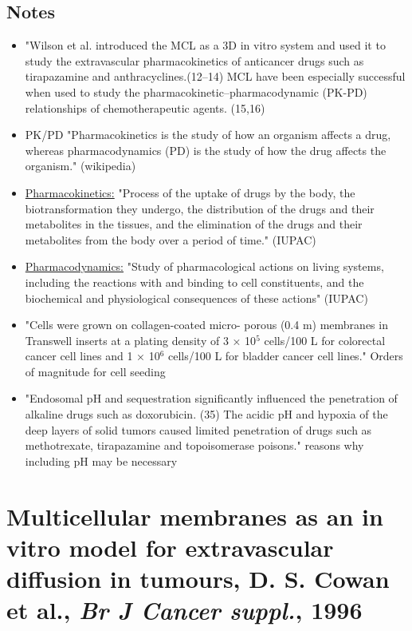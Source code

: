 \documentclass[11pt,a4paper]{article}
\begin{document}
\subsection*{Notes}
\begin{itemize}
\item "Wilson et al. introduced the MCL as a 3D in vitro system and used it to study the extravascular pharmacokinetics of anticancer drugs such as tirapazamine and anthracyclines.(12–14) MCL have been especially successful when used to study the pharmacokinetic–pharmacodynamic (PK-PD) relationships of chemotherapeutic agents. (15,16)
\item PK/PD "Pharmacokinetics is the study of how an organism affects a drug, whereas pharmacodynamics (PD) is the study of how the drug affects the organism." (wikipedia)
\item \underline{Pharmacokinetics:} "Process of the uptake of drugs by the body, the biotransformation they undergo, the distribution of the drugs and their metabolites in the tissues, and the elimination of the drugs and their metabolites from the body over a period of time." (IUPAC)
\item \underline{Pharmacodynamics:} "Study of pharmacological actions on living systems, including the reactions with and binding to cell constituents, and the biochemical and physiological consequences of these actions" (IUPAC)
\item "Cells were grown on collagen-coated micro- porous (0.4 \textmu m) membranes in Transwell inserts at a plating density of 3 × 10$^5$ cells/100 \textmu L for colorectal cancer cell lines and 1 × 10$^6$ cells/100 \textmu L for bladder cancer cell lines." Orders of magnitude for cell seeding
\item "Endosomal pH and sequestration significantly influenced the penetration of alkaline drugs such as doxorubicin. (35) The acidic pH and hypoxia of the deep layers of solid tumors caused limited penetration of drugs such as methotrexate, tirapazamine and topoisomerase poisons." reasons why including pH may be necessary
\end{itemize}

\section*{Multicellular membranes as an in vitro model for extravascular diffusion in tumours, D. S. Cowan et al., \textit{Br J Cancer suppl.}, 1996}
\end{document}
